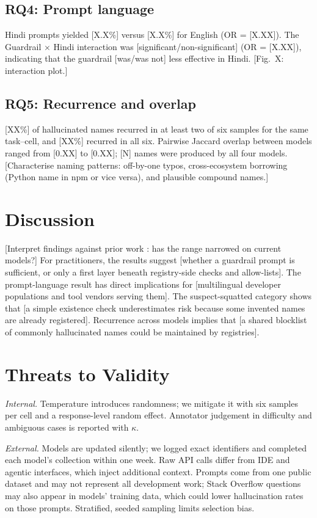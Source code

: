 \documentclass[conference]{IEEEtran}
\begin{document}
\subsection{RQ4: Prompt language}
Hindi prompts yielded [X.X\%] versus [X.X\%] for English (OR = [X.XX]). The Guardrail $\times$ Hindi interaction was [significant/non-significant] (OR = [X.XX]), indicating that the guardrail [was/was not] less effective in Hindi. [Fig.~X: interaction plot.]

\subsection{RQ5: Recurrence and overlap}
[XX\%] of hallucinated names recurred in at least two of six samples for the same task--cell, and [XX\%] recurred in all six. Pairwise Jaccard overlap between models ranged from [0.XX] to [0.XX]; [N] names were produced by all four models. [Characterise naming patterns: off-by-one typos, cross-ecosystem borrowing (Python name in npm or vice versa), and plausible compound names.]

\section{Discussion}
[Interpret findings against prior work \cite{spracklen2025,churilov2026}: has the range narrowed on current models?] For practitioners, the results suggest [whether a guardrail prompt is sufficient, or only a first layer beneath registry-side checks and allow-lists]. The prompt-language result has direct implications for [multilingual developer populations and tool vendors serving them]. The suspect-squatted category shows that [a simple existence check underestimates risk because some invented names are already registered]. Recurrence across models implies that [a shared blocklist of commonly hallucinated names could be maintained by registries].

\section{Threats to Validity}
\textit{Internal.} Temperature introduces randomness; we mitigate it with six samples per cell and a response-level random effect. Annotator judgement in difficulty and ambiguous cases is reported with $\kappa$.

\textit{External.} Models are updated silently; we logged exact identifiers and completed each model's collection within one week. Raw API calls differ from IDE and agentic interfaces, which inject additional context. Prompts come from one public dataset \cite{dataset2025} and may not represent all development work; Stack Overflow questions may also appear in models' training data, which could lower hallucination rates on those prompts. Stratified, seeded sampling limits selection bias.
\end{document}
